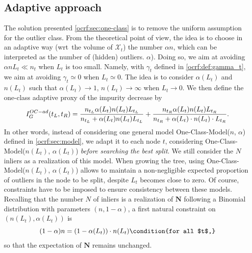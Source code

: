 \subsection{Adaptive approach}
The solution presented \cref{ocrf:sec:one-class} is to remove the uniform
assumption for the outlier class. From the theoretical point of view, the idea
is to choose in an adaptive way (\acs{wrt}~the volume of $\mathcal{X}_t$) the
number $\alpha n$, which can be interpreted as the number of (hidden) outliers.
$\alpha$).  Doing so, we aim at avoiding $\alpha n L_t \ll n_t$ when $L_t$ is
too small. Namely, with $\gamma_t$ defined in \cref{ocrf:def:gamma_t}, we aim
at avoiding $\gamma_t \simeq 0$ when $L_t \simeq 0$. The idea is to consider
$\alpha(L_t)$ and $n(L_t)$ such that $\alpha(L_t) \to 1$, $n(L_t) \to \infty$
when $L_t \to 0$.  We then define the one-class adaptive proxy of the impurity
decrease by
\begin{dmath}
    \label{ocrf:oc_proxy_ad1}
    \nonumber I_G^{OC-ad}(t_L, t_R) = \frac{n_{t_L}\alpha(L_t) n(L_t)
    L_{t_L}}{n_{t_L} + \alpha(L_t) n(L_t) L_{t_L}} \\ +
    \frac{n_{t_R}\alpha(L_t) n(L_t) L_{t_R}}{n_{t_R} + \alpha(L_t)
    \cdot n(L_t) \cdot L_{t_R}}.
\end{dmath}
In other words, instead of considering one general model One-Class-Model($n$,
$\alpha$) defined in \cref{ocrf:sec:model}, we adapt it to each node $t$,
considering One-Class-Model($n(L_t)$, $\alpha(L_t)$) \emph{before searching the
best split}. We still consider the $N$ inliers as a realization of this model.
When growing the tree, using One-Class-Model($n(L_t)$, $\alpha(L_t)$) allows to
maintain a non-negligible expected proportion of outliers in the node to be
split,
despite $L_t$ becomes close to zero.  Of course, constraints have to be imposed
to ensure consistency between these models.
%
Recalling that the number $N$ of inliers is a realization of $\mathbf{N}$
following a Binomial distribution with parameters $(n, 1-\alpha)$, a first
natural constraint on $\left(n(L_t), \alpha(L_t)\right)$ is
\begin{dmath}
    \label{ocrf:constraint1}
    (1-\alpha)n = \left(1-\alpha(L_t)\right) \cdot n(L_t) \condition{for all
    $t$,}
\end{dmath}
so that the expectation of $\mathbf{N}$ remains unchanged.
